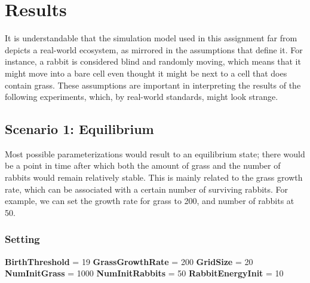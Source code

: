 \documentclass[11pt]{article}
\begin{document}
\section{Results}
It is understandable that the simulation model used in this assignment far from depicts a real-world ecosystem, as mirrored in the assumptions that define it. For instance, a rabbit is considered blind and randomly moving, which means that it might move into a bare cell even thought it might be next to a cell that does contain grass. These assumptions are important in interpreting the results of the following experiments, which, by real-world standards, might look strange.

\subsection{Scenario 1: Equilibrium}
Most possible parameterizations would result to an equilibrium state; there would be a point in time after which both the amount of grass and the number of rabbits would remain relatively stable. This is mainly related to the grass growth rate, which can be associated with a certain number of surviving rabbits. For example, we can set the growth rate for grass to 200, and number of rabbits at 50.

\begin{multicols}{2}
\subsubsection{Setting}
\textbf{BirthThreshold} = 19 \newline
\textbf{GrassGrowthRate} = 200 \newline
\textbf{GridSize} = 20 \newline
\newline
\textbf{NumInitGrass} = 1000 \newline
\textbf{NumInitRabbits} = 50  \newline
\textbf{RabbitEnergyInit} = 10 \newline
\end{multicols}
\end{document}
